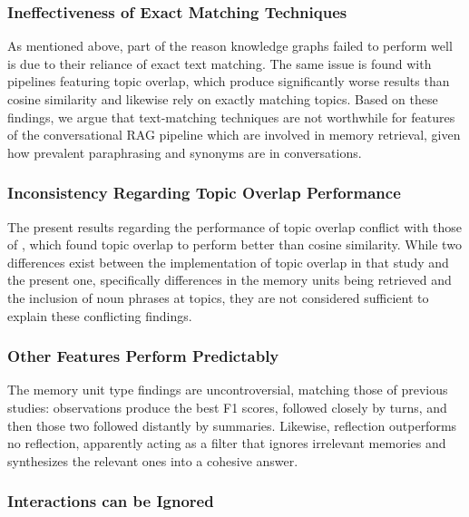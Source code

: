 \subsubsection{Ineffectiveness of Exact Matching Techniques}

As mentioned above, part of the reason knowledge graphs failed to perform well is due to their reliance of exact text matching. The same issue is found with pipelines featuring topic overlap, which produce significantly worse results than cosine similarity and likewise rely on exactly matching topics. Based on these findings, we argue that text-matching techniques are not worthwhile for features of the conversational RAG pipeline which are involved in memory retrieval, given how prevalent paraphrasing and synonyms are in conversations.


\subsubsection{Inconsistency Regarding Topic Overlap Performance}

The present results regarding the performance of topic overlap conflict with those of \cite{Li2024}, which found topic overlap to perform better than cosine similarity. While two differences exist between the implementation of topic overlap in that study and the present one, specifically differences in the memory units being retrieved and the inclusion of noun phrases at topics, they are not considered sufficient to explain these conflicting findings.


\subsubsection{Other Features Perform Predictably}

The memory unit type findings are uncontroversial, matching those of previous studies: observations produce the best F1 scores, followed closely by turns, and then those two followed distantly by summaries. Likewise, reflection outperforms no reflection, apparently acting as a filter that ignores irrelevant memories and synthesizes the relevant ones into a cohesive answer. 


\subsubsection{Interactions can be Ignored}

